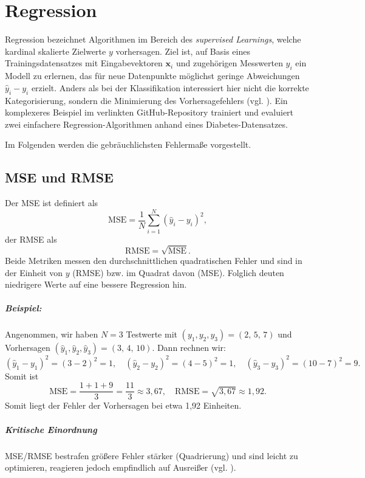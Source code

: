 \chapter{Regression}
Regression bezeichnet Algorithmen im Bereich des \emph{supervised Learnings},
welche kardinal skalierte Zielwerte \(y\) vorhersagen. Ziel
ist, auf Basis eines Trainingsdatensatzes mit Eingabevektoren \(\mathbf{x}_i\)
und zugehörigen Messwerten \(y_i\) ein Modell zu erlernen, das für neue
Datenpunkte möglichst geringe Abweichungen \(\hat y_i - y_i\) erzielt. Anders
als bei der Klassifikation interessiert hier nicht die korrekte
Kategorisierung, sondern die Minimierung des Vorhersagefehlers (vgl. \cite{Miller2024}). 
Ein komplexeres Beispiel im verlinkten GitHub-Repository trainiert und evaluiert zwei einfachere Regression-Algorithmen 
anhand eines Diabetes-Datensatzes.

Im Folgenden werden die gebräuchlichsten Fehlermaße vorgestellt.

\section{\acs{MSE} und \acs{RMSE}}

Der \ac{MSE} ist definiert als 
\[
  \mathrm{MSE} = \frac{1}{N}\sum_{i=1}^N (\hat y_i - y_i)^2,
\]
der \ac{RMSE} als
\[
  \mathrm{RMSE} = \sqrt{\mathrm{MSE}}.
\]
Beide Metriken messen den durchschnittlichen quadratischen Fehler und sind in der Einheit von \(y\) (\ac{RMSE}) bzw. im Quadrat davon (\ac{MSE}).
Folglich deuten niedrigere Werte auf eine bessere Regression hin.

\paragraph{Beispiel:}  
Angenommen, wir haben \(N=3\) Testwerte mit  
\((y_1,y_2,y_3) = (2,\,5,\,7)\) und Vorhersagen \((\hat y_1,\hat y_2,\hat y_3) = (3,\,4,\,10)\).  
Dann rechnen wir:
\[
  (\hat y_1 - y_1)^2 = (3-2)^2 = 1,\quad
  (\hat y_2 - y_2)^2 = (4-5)^2 = 1,\quad
  (\hat y_3 - y_3)^2 = (10-7)^2 = 9.
\]
Somit ist
\[
  \mathrm{MSE} = \frac{1 + 1 + 9}{3} = \frac{11}{3} \approx 3{,}67,
  \quad
  \mathrm{RMSE} = \sqrt{3{,}67} \approx 1{,}92.
\]
Somit liegt der Fehler der Vorhersagen bei etwa 1,92 Einheiten.

\paragraph{Kritische Einordnung}
\ac{MSE}/\ac{RMSE} bestrafen größere Fehler stärker (Quadrierung) und sind leicht zu optimieren, reagieren jedoch empfindlich auf Ausreißer (vgl. \cite{hodson2022root}).

